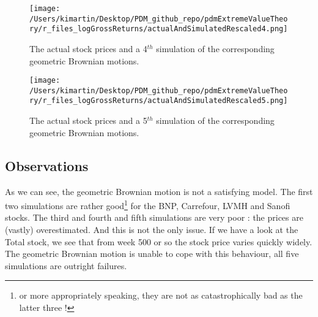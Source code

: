 \newpage
\begin{figure}[h!]
	\centering
	\texttt{[image: /Users/kimartin/Desktop/PDM\_github\_repo/pdmExtremeValueTheory/r\_files\_logGrossReturns/actualAndSimulatedRescaled4.png]}
	\caption{The actual stock prices and a 4$^{th}$ simulation of the corresponding geometric Brownian motions.}
	\label{fig:ActualAndManySimulatedGeomBMs4}
\end{figure}
\newpage
\begin{figure}[h!]
	\centering
	\texttt{[image: /Users/kimartin/Desktop/PDM\_github\_repo/pdmExtremeValueTheory/r\_files\_logGrossReturns/actualAndSimulatedRescaled5.png]}
	\caption{The actual stock prices and a 5$^{th}$ simulation of the corresponding geometric Brownian motions.}
	\label{fig:ActualAndManySimulatedGeomBMs5}
\end{figure}
\clearpage
\subsection{Observations}
As we can see, the geometric Brownian motion is not a satisfying model. The first two simulations are rather good\footnote{or more appropriately speaking, they are not as catastrophically bad as the latter three !} for the BNP, Carrefour, LVMH and Sanofi stocks. The third and fourth and fifth simulations are very poor : the prices are (vastly) overestimated. And this is not the only issue. If we have a look at the Total stock, we see that from week 500 or so the stock price varies quickly widely. The geometric Brownian motion is unable to cope with this behaviour, all five simulations are outright failures.
